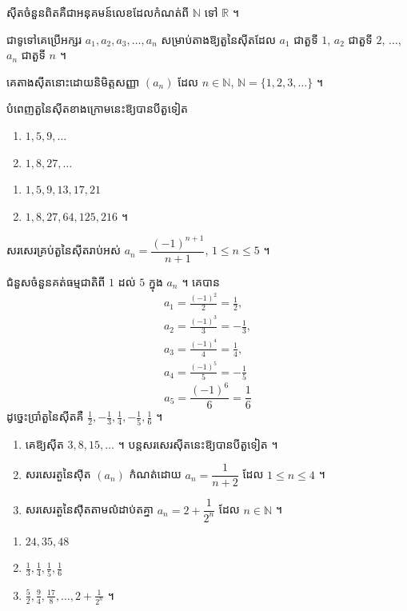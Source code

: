 \begin{definition}
ស៊ីតចំនួនពិតគឺជាអនុគមន៍លេខដែលកំណត់ពី $\mathbb{N}$ ទៅ $\mathbb{R}$ ។
\end{definition}

ជាទូទៅគេប្រើអក្សរ $a_1, a_2, a_3, \ldots, a_n$ សម្រាប់តាងឱ្យតួនៃស៊ីតដែល $a_1$ ជាតួទី $1$, $a_2$ ជាតួទី $2$, $\ldots$, $a_n$ ជាតួទី $n$ ។

គេតាងស៊ីតនោះដោយនិមិត្តសញ្ញា $(a_n)$ ដែល $n \in \mathbb{N}$, $\mathbb{N} = \{1, 2, 3, \ldots\}$ ។

\begin{example}[លំហាត់គំរូ ១]
បំពេញតួនៃស៊ីតខាងក្រោមនេះឱ្យបានបីតួទៀត
\begin{enumerate}[a]
  \item $1, 5, 9, \ldots$
  \item $1, 8, 27, \ldots$
\end{enumerate}
\end{example}
\ans
\begin{enumerate}[a]
  \item $1, 5, 9, 13, 17, 21$
  \item $1, 8, 27, 64, 125, 216$ ។
\end{enumerate}

\begin{example}[លំហាត់គំរូ ២]
សរសេរគ្រប់តួនៃស៊ីតរាប់អស់ $a_n = \dfrac{(-1)^{n+1}}{n+1}$, $1 \le n \le 5$ ។
\end{example}
\ans
ជំនួសចំនួនគត់ធម្មជាតិពី $1$ ដល់ $5$ ក្នុង $a_n$ ។ គេបាន
\[
\begin{gathered}
a_1 = \frac{(-1)^2}{2} = \frac{1}{2},\\
a_2 = \frac{(-1)^3}{3} = -\frac{1}{3},\\ a_3 = \frac{(-1)^4}{4} = \frac{1}{4},\\
a_4 = \frac{(-1)^5}{5} = -\frac{1}{5}
\end{gathered}
\]
\[
a_5 = \frac{(-1)^6}{6} = \frac{1}{6}
\]
ដូច្នេះប្រាំតួនៃស៊ីតគឺ $\frac{1}{2}, -\frac{1}{3}, \frac{1}{4}, -\frac{1}{5}, \frac{1}{6}$ ។

\begin{pro}
\begin{enumerate}[a]
  \item គេឱ្យស៊ីត $3, 8, 15, \ldots$ ។ បន្តសរសេរស៊ីតនេះឱ្យបានបីតួទៀត ។
  \item សរសេរតួនៃស៊ីត $(a_n)$ កំណត់ដោយ $a_n = \dfrac{1}{n+2}$ ដែល $1 \le n \le 4$ ។
  \item សរសេរតួនៃស៊ីតតាមលំដាប់តគ្នា $a_n = 2 + \dfrac{1}{2^n}$ ដែល $n \in \mathbb{N}$ ។
\end{enumerate}
\ans
\begin{enumerate}[a]
  \item $24, 35, 48$
  \item $\frac{1}{3}, \frac{1}{4}, \frac{1}{5}, \frac{1}{6}$
  \item $\frac{5}{2}, \frac{9}{4}, \frac{17}{8}, \ldots, 2 + \frac{1}{2^n}$ ។
\end{enumerate}
\end{pro}

